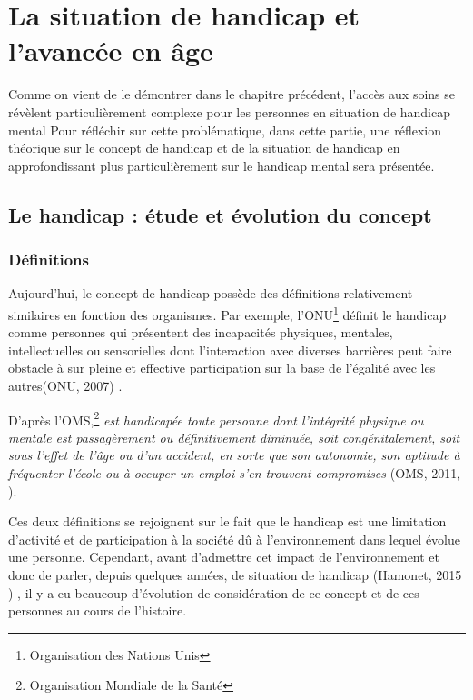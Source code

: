 \chapter{La situation de handicap et l'avancée en âge}

Comme on vient de le démontrer dans le chapitre précédent, l'accès aux soins se révèlent particulièrement complexe pour les personnes en situation de handicap mental  Pour réfléchir sur cette problématique, dans cette partie, une réflexion théorique sur le concept de handicap et de la situation de handicap en approfondissant plus particulièrement sur le handicap mental sera présentée.

\section{Le handicap : étude et évolution du concept}
\subsection{Définitions}

Aujourd'hui, le concept de handicap possède des définitions relativement similaires en fonction des organismes.
Par exemple, l'ONU\footnote{Organisation des Nations Unis} définit le handicap comme \og personnes qui présentent des incapacités physiques, mentales, intellectuelles ou sensorielles dont l’interaction avec diverses barrières peut faire obstacle à sur pleine et effective participation sur la base de l’égalité avec les autres\fg (ONU, 2007) \cite{ONU2007}.

D'après l'OMS,\footnote{Organisation Mondiale de la Santé} \og \textit{est handicapée toute personne dont l’intégrité physique ou mentale est passagèrement ou définitivement diminuée, soit congénitalement, soit sous l’effet de l’âge ou d’un accident, en sorte que son autonomie, son aptitude à fréquenter l’école ou à occuper un emploi s’en trouvent compromises}\fg{} (OMS, 2011, \cite{OMS2011}).

Ces deux définitions se rejoignent sur le fait que le handicap est une limitation d'activité et de participation à la société dû à l'environnement dans lequel évolue une personne. Cependant, avant d'admettre cet impact de l'environnement et donc de parler, depuis quelques années, de \og situation de handicap\fg{} (Hamonet, 2015 \cite{Hamonet2015}) , il y a eu beaucoup d'évolution de considération de ce concept et de ces personnes au cours de l'histoire.

